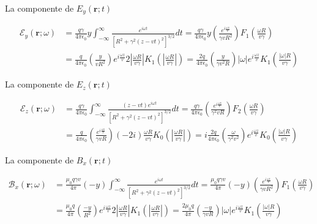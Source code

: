\documentclass[a4paper,10pt]{article}
\begin{document}
La componente de $E_y(\textbf{r};t)$

\begin{equation}
\begin{aligned}
\mathcal{E}_y(\textbf{r};\omega)	&=\frac{q\gamma}{4\pi\epsilon_0} y\int_{-\infty}^{\infty} \frac{e^{i\omega t}}{[R^2+\gamma^2(z-vt)^2]^{3/2}} dt	
	=\frac{q\gamma}{4\pi\epsilon_0} y\left(\frac{e^{i\frac{\omega z}{v}} }{\gamma vR^2} \right) F_1\left( \frac{\omega R}{v\gamma}\right)	\\
	&=\frac{q}{4\pi\epsilon_0} \left(\frac{y}{v R^2} \right) e^{i\frac{\omega z}{v}} 2 \left| \frac{\omega R}{v \gamma} \right| K_1 \left( \left| \frac{\omega R}{v \gamma} \right| \right)
	=\frac{2q}{4\pi\epsilon_0} \left(\frac{y}{\gamma v^2 R} \right) |\omega| e^{i\frac{\omega z}{v}} K_1 \left(\frac{|\omega| R}{v \gamma} \right)
\end{aligned}
\end{equation}

La componente de $E_z(\textbf{r};t)$

\begin{equation}
\begin{aligned}
\mathcal{E}_z(\textbf{r};\omega)	&=\frac{q\gamma}{4\pi\epsilon_0} \int_{-\infty}^{\infty} \frac{(z-vt)e^{i\omega t}}{[R^2+\gamma^2(z-vt)^2]^{3/2}} dt	
	=\frac{q\gamma}{4\pi\epsilon_0} \left(\frac{e^{i\frac{\omega z}{v}} }{\gamma^2 vR} \right) F_2\left( \frac{\omega R}{v\gamma}\right)	\\
	&=\frac{q}{4\pi\epsilon_0} \left(\frac{e^{i\frac{\omega z}{v}}}{\gamma v R} \right) (-2i) \frac{\omega R}{v \gamma} K_0 \left( \left| \frac{\omega R}{v \gamma} \right| \right)
	=i\frac{2q}{4\pi\epsilon_0} \left(\frac{\omega}{\gamma^2 v^2} \right) e^{i\frac{\omega z}{v}} K_0 \left(\frac{|\omega| R}{v \gamma} \right)
\end{aligned}
\end{equation}

La componente de $B_x(\textbf{r};t)$

\begin{equation}
\begin{aligned}
\mathcal{B}_x(\textbf{r};\omega)	&=\frac{\mu_0 q\gamma v}{4\pi} (-y)\int_{-\infty}^{\infty} \frac{e^{i\omega t}}{[R^2+\gamma^2(z-vt)^2]^{3/2}} dt	
	=\frac{\mu_0 q\gamma v}{4\pi} (-y) \left(\frac{e^{i\frac{\omega z}{v}} }{\gamma vR^2} \right) F_1\left( \frac{\omega R}{v\gamma}\right)	\\
	&=\frac{\mu_0 q}{4\pi} \left(\frac{-y}{R^2} \right) e^{i\frac{\omega z}{v}} 2 \left| \frac{\omega R}{v \gamma} \right| K_1 \left( \left| \frac{\omega R}{v \gamma} \right| \right)
	=\frac{2\mu_0 q}{4\pi}  \left(\frac{-y}{\gamma v R} \right) |\omega| e^{i\frac{\omega z}{v}} K_1 \left(\frac{|\omega| R}{v \gamma} \right)
\end{aligned}
\end{equation}
\end{document}
